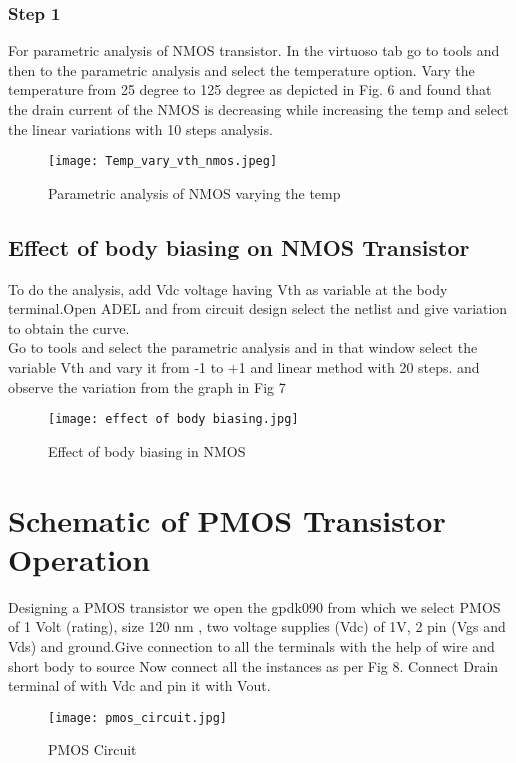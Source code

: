\documentclass[conference]{IEEEtran}
\begin{document}
\subsubsection{Step 1}
For  parametric analysis of NMOS transistor. In the virtuoso tab go to tools and then to  the parametric analysis and select the temperature option. Vary the temperature from 25 degree to 125 degree as depicted in Fig. 6 and found that the drain current of the NMOS is decreasing while increasing the temp and select the linear variations with 10 steps analysis.
\begin{figure}
    \centering
    \texttt{[image: Temp\_vary\_vth\_nmos.jpeg]}
    \caption{Parametric analysis of NMOS varying the temp}
    \label{fig:enter-label}
\end{figure}



\subsection{Effect of body biasing on NMOS Transistor}
To do the analysis, add Vdc voltage  having Vth as variable at the body terminal.Open ADEL and from circuit design select the netlist and give variation to obtain the curve.\\
Go to tools and select the parametric analysis and in that window select the variable Vth and vary it from -1 to +1 and linear method with 20 steps. and observe the variation from the graph in Fig 7

\begin{figure}
    \centering
    \texttt{[image: effect of body biasing.jpg]}
    \caption{Effect of body biasing in NMOS}
    \label{fig:enter-label}
\end{figure}

\section{Schematic of PMOS Transistor Operation}

 Designing  a PMOS transistor we open the gpdk090 from which we select PMOS of 1 Volt (rating), size 120 nm , two voltage supplies (Vdc) of 1V,  2 pin (Vgs and Vds) and ground.Give connection to all the terminals with the help of wire and short body to source Now connect all the instances as per Fig 8. Connect Drain terminal of with Vdc and pin it with Vout.
 \begin{figure}
     \centering
     \texttt{[image: pmos\_circuit.jpg]}
     \caption{PMOS Circuit}
     \label{fig:enter-label}
 \end{figure}
\end{document}
